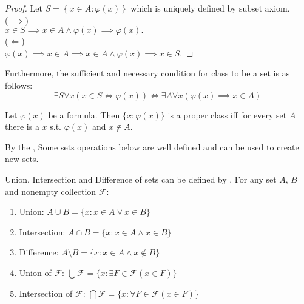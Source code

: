 \begin{proof}
    Let $S = \left\{x \in A \colon \varphi(x) \right\}$ which is
    uniquely defined by subset axiom.\\
    ($ \implies $)\\
    $x \in S \implies x \in A \land \varphi(x) \implies \varphi(x).$\\
    ($ \Leftarrow $)\\
    $\varphi(x) \implies x \in A \implies x \in A \land \varphi(x)
    \implies x \in S.$
\end{proof}
\begin{remarks}
    Furthermore, the sufficient and necessary condition for class to be
    a set is as follows:
    \begin{equation*}
        \exists S \forall x(x \in S \iff \varphi(x)) \iff \exists A
        \forall x(\varphi(x) \implies x \in A)
    \end{equation*}
\end{remarks}

\begin{corollary}{}{}
    Let $\varphi(x)$ be a formula. Then $\{x:\varphi(x)\}$ is a proper
    class iff for every set $A$ there is a $x$ s.t. $\varphi(x)$ and
    $x \notin A$.

\end{corollary}
By the , Some sets operations below are well defined and
can be used to create new sets.

\begin{corollary}{}{}
    Union, Intersection and Difference of sets can be defined by
    . For any set $A$, $B$ and nonempty collection $\mathcal{F}$:\\
    \begin{enumerate}
        \item Union: $A \cup B = \{x: x \in A \lor x \in B\} $
        \item Intersection: $A \cap B = \{x: x \in A \land x \in B\}$
        \item Difference: $A \setminus B = \{x: x \in A \land x \notin B\}$
        \item Union of $\mathcal{F}$: $\bigcup \mathcal{F} = \{x: \exists
            F \in \mathcal{F}(x\in F)\}$
        \item Intersection of $\mathcal{F}$: $\bigcap \mathcal{F} = \{x:
            \forall F \in \mathcal{F}(x\in F)\}$
    \end{enumerate}
\end{corollary}


